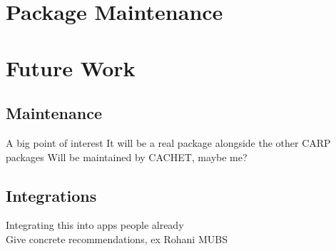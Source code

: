 \section{Package Maintenance}


\section{Future Work}
\subsection{Maintenance}
A big point of interest
It will be a real package alongside the other CARP packages
Will be maintained by CACHET, maybe me?

\subsection{Integrations}
Integrating this into apps people already\\
Give concrete recommendations, ex Rohani MUBS\\